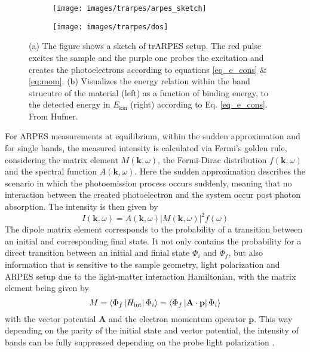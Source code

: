 \begin{figure}
	\centering
	\begin{subfigure}[b]{0.49\textwidth}
		\texttt{[image: images/trarpes/arpes\_sketch]}
		\caption{}
	\end{subfigure}
	\hfill
	\begin{subfigure}[b]{0.4\textwidth}
		\texttt{[image: images/trarpes/dos]}
		\caption{}
	\end{subfigure}
	\caption{(a) The figure shows a sketch of trARPES setup. The red pulse excites the sample and the purple one probes the excitation and creates the photoelectrons according to equations \ref{eq_e_cons} \& \ref{eq:mom}. (b) Visualizes the energy relation within the band strucutre of the material (left) as a function of binding energy, to the detected energy in $E_\text{kin}$ (right) according to Eq. \ref{eq_e_cons}. From \cite{} Hufner.}
	\label{fig:arpes_sketch}
\end{figure}

For ARPES measurements at equilibrium, within the sudden approximation and for single bands, the measured intensity is calculated via Fermi's golden rule, considering the matrix element $M(\mathbf{k}, \omega)$, the Fermi-Dirac distribution $f(\mathbf{k}, \omega)$ and the spectral function $A(\mathbf{k}, \omega)$.
Here the sudden approximation describes the scenario in which the photoemission process occurs suddenly, meaning that no interaction between the created photoelectron and the system occur post photon absorption.
The intensity is then given by
\begin{equation}
	I(\mathbf{k}, \omega) = A(\mathbf{k}, \omega)\left|M(\mathbf{k}, \omega)\right|^2f(\omega)
	\label{eq:arpes_signal}
\end{equation}
The dipole matrix element corresponds to the probability of a transition between an initial and corresponding final state.
It not only contains the probability for a direct transition between an initial and finial state $\Phi_i$ and $\Phi_f$, but also information that is sensitive to the sample geometry, light polarization and ARPES setup due to the light-matter interaction Hamiltonian,
with the matrix element being given by
\begin{equation}
	M = \braket{\Phi_f\left|H_\text{int}\right|\Phi_i} =\braket{\Phi_f\left| \mathbf{A} \cdot \mathbf{p} \right|\Phi_i}
\end{equation}
with the vector potential $\mathbf{A}$ and the electron momentum operator $\mathbf{p}$.
This way depending on the parity of the initial state and vector potential, the intensity of bands can be fully suppressed depending on the probe light polarization \cite{gierz_illuminating_2011, cao_mapping_2013,zhu_layer-by-layer_2013,schuler_polarization-modulated_2022}.

